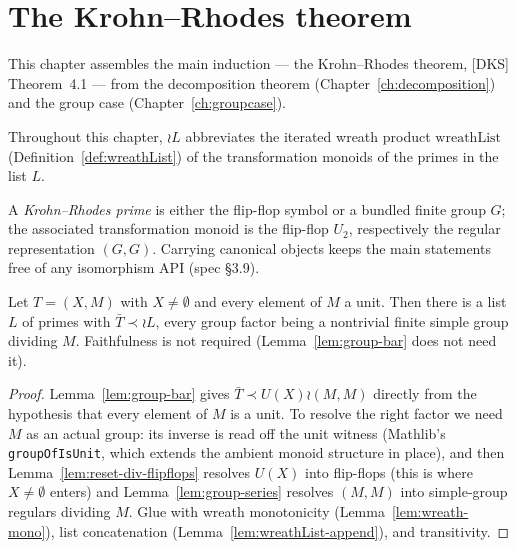 \chapter{The Krohn--Rhodes theorem}\label{ch:krohnrhodes}

This chapter assembles the main induction --- the Krohn--Rhodes
theorem, [DKS] Theorem~4.1 --- from the decomposition theorem
(Chapter~\ref{ch:decomposition}) and the group case
(Chapter~\ref{ch:groupcase}).

Throughout this chapter, $\wr L$ abbreviates the iterated wreath product
$\mathrm{wreathList}$ (Definition~\ref{def:wreathList}) of the
transformation monoids of the primes in the list $L$.

\begin{definition}\label{def:krprime}
  \leanok
  A \emph{Krohn--Rhodes prime} is either the flip-flop symbol or a
  bundled finite group $G$; the associated transformation monoid is
  the flip-flop $U_2$, respectively the regular representation
  $(G, G)$. Carrying canonical objects keeps the main statements free
  of any isomorphism API (spec \S 3.9).
\end{definition}

\begin{lemma}\label{lem:kr-group-branch}
  \leanok
  Let $T = (X, M)$ with $X \neq \emptyset$ and every element of $M$ a
  unit. Then there is a list $L$ of primes with
  $\bar{T} \prec \wr L$, every group factor being a nontrivial finite
  simple group dividing $M$. Faithfulness is not required
  (Lemma~\ref{lem:group-bar} does not need it).
\end{lemma}
\begin{proof}
  \leanok
  Lemma~\ref{lem:group-bar} gives
  $\bar{T} \prec U(X) \wr (M, M)$ directly from the hypothesis that
  every element of $M$ is a unit. To resolve the right factor we need
  $M$ as an actual group: its inverse is read off the unit witness
  (Mathlib's \texttt{groupOfIsUnit}, which extends the ambient monoid
  structure in place), and then Lemma~\ref{lem:reset-div-flipflops}
  resolves $U(X)$ into flip-flops (this is where $X \neq \emptyset$
  enters) and Lemma~\ref{lem:group-series} resolves $(M, M)$ into
  simple-group regulars dividing $M$. Glue with wreath monotonicity
  (Lemma~\ref{lem:wreath-mono}), list concatenation
  (Lemma~\ref{lem:wreathList-append}), and transitivity.
\end{proof}

